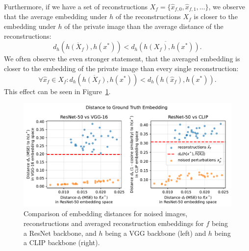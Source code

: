 \documentclass[10pt,twocolumn]{article}
\begin{document}
Furthermore, if we have a set of reconstructions $X_f = \{\hat x_{f,0}, \hat x_{f,1}, \dots\}$, we observe that the average embedding under $h$ of the reconstructions $X_f$ is closer to the embedding under $h$ of the private image than the average distance of the reconstructions:
\begin{equation}
d_h\left(\overline{h(X_f)}, h(x^*)\right) < \overline{d_h(h(X_f), h(x^*))}.
\end{equation}
We often observe the even stronger statement, that the averaged embedding is closer to the embedding of the private image than every single reconstruction:
\begin{equation}
\forall\hat x_f \in X_f: d_h\left(\overline{h(X_f)}, h(x^*)\right) < d_h(h(\hat x_f), h(x^*)).
\end{equation}
This effect can be seen in Figure~\ref{fig:avg_distance_scatter}.
\begin{figure}[ht]
    \centering
    \includegraphics[width=\linewidth]{figures/avg-distance-scatter}
    \caption{
       Comparison of embedding distances for noised images, reconstructions and averaged reconstruction embeddings for $f$ being a ResNet backbone, and $h$ being a VGG backbone (left) and $h$ being a CLIP backbone (right).
    }
    \label{fig:avg_distance_scatter}
\end{figure}
\end{document}

